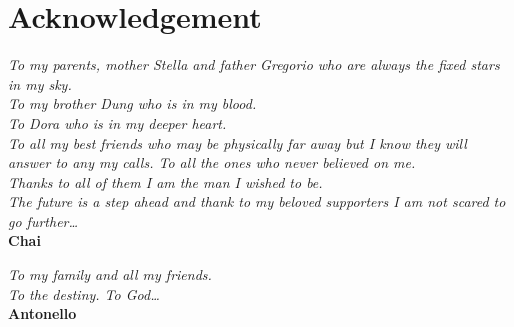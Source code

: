 \chapter{Acknowledgement}
\setlength{\parskip}{0.8em}
\begin{flushright}
\textit{
	To my parents, mother Stella and father Gregorio who are always the fixed stars in my sky.\\
	To my brother Dung who is in my blood.\\
	To Dora who is in my deeper heart.\\
	To all my best friends who may be physically far away but I know they will answer to any my calls.
	To all the ones who never believed on me.\\
	Thanks to all of them I am the man I wished to be.\\
	The future is a step ahead and thank to my beloved supporters I am not scared to go further\dots
}\\
\textbf{Chai}
\end{flushright}

\textit{
	To my family and all my friends.\\
	To the destiny.	To God\dots
}\\
\textbf{Antonello}

\setlength{\parskip}{0em}